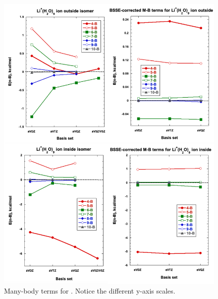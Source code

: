 \begin{figure}[ht]
    \centering
    \begin{adjustbox}{max size={.6\textwidth}{.6\textheight}}
    \includegraphics[width=\textwidth]{Figures/Chapter_3/figure_6_combined.png}
    \end{adjustbox}
    \begin{spacing}{1.0}
  \caption{Many-body terms for . Notice the different y-axis scales.}\label{fig:MBE_II_7}
  \end{spacing}
\end{figure}